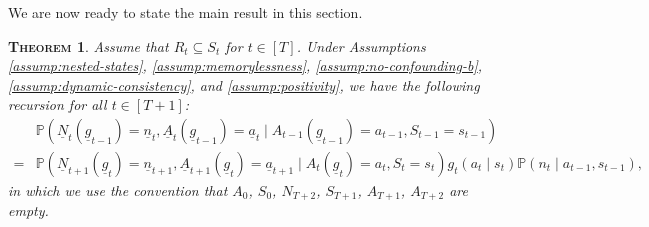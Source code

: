 \documentclass[12pt,a4paper]{article}
\newtheorem{theorem}{\normalfont\scshape Theorem}
\theoremstyle{definition}
\newcommand{\PP}[0]{\mathbb{P}}
\begin{document}
We are now ready to state the main result in this section.
\begin{theorem}\label{thm:innovation_recursion}
    Assume that $R_t \subseteq S_t$ for $t \in [T]$. Under Assumptions
    \ref{assump:nested-states}, \ref{assump:memorylessness},
    \ref{assump:no-confounding-b}, \ref{assump:dynamic-consistency},
    and \ref{assump:positivity}, we have the following recursion for
    all $t \in [T+1]$:  %
    \begin{equation}
      \label{eq:innovation_recursion}
      \begin{split}
        &\mathbb{P}(\underline{N}_{t}(\underline{g}_{t-1}) = \underline{n}_{t}, \underline{A}_{t}(\underline{g}_{t-1}) = \underline{a}_{t} \mid A_{t-1}(\underline{g}_{t-1}) = a_{t-1}, S_{t-1} = s_{t-1}) \\
        = &\mathbb{P}(\underline{N}_{t+1}(\underline{g}_t) = \underline{n}_{t+1}, \underline{A}_{t+1}(\underline{g}_t) = \underline{a}_{t+1} \mid A_{t}(\underline{g}_t) = a_t, S_t = s_t) g_t(a_t \mid s_t)\PP(n_t \mid a_{t-1}, s_{t-1}),
      \end{split}
    \end{equation}
    in which we use the convention that $A_0$, $S_0$,
    $N_{T+2}$, $S_{T+1}$, $A_{T+1}$, $A_{T+2}$ are empty.
  \end{theorem}
\end{document}
